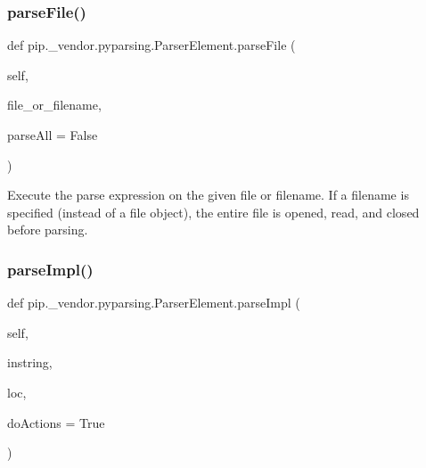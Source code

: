 \subsubsection{\texorpdfstring{parse\+File()}{parseFile()}}
{\footnotesize\ttfamily def pip.\+\_\+vendor.\+pyparsing.\+Parser\+Element.\+parse\+File (\begin{DoxyParamCaption}\item[{}]{self,  }\item[{}]{file\+\_\+or\+\_\+filename,  }\item[{}]{parse\+All = {\ttfamily False} }\end{DoxyParamCaption})}

\begin{DoxyVerb}Execute the parse expression on the given file or filename.
If a filename is specified (instead of a file object),
the entire file is opened, read, and closed before parsing.
\end{DoxyVerb}
 \mbox{\label{classpip_1_1__vendor_1_1pyparsing_1_1ParserElement_a6b2d3f63ecb4d2e406dfaca22f33901a}} 
\subsubsection{\texorpdfstring{parse\+Impl()}{parseImpl()}}
{\footnotesize\ttfamily def pip.\+\_\+vendor.\+pyparsing.\+Parser\+Element.\+parse\+Impl (\begin{DoxyParamCaption}\item[{}]{self,  }\item[{}]{instring,  }\item[{}]{loc,  }\item[{}]{do\+Actions = {\ttfamily True} }\end{DoxyParamCaption})}

\mbox{\label{classpip_1_1__vendor_1_1pyparsing_1_1ParserElement_af2fadff2831dce8c0b70c0cfb9b3557d}} 
